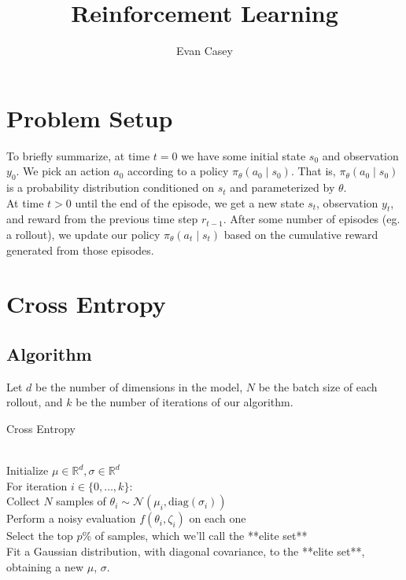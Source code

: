\documentclass[11pt]{article}
\theoremstyle{plain}
\theoremstyle{definition}
\begin{document}
\title{Reinforcement Learning}
\author{Evan Casey}
\maketitle
\setlength\parindent{0pt}

\section{Problem Setup}

To briefly summarize, at time $t = 0$ we have some initial state $s_0$ and observation $y_0$. We pick an action $a_0$ according to a policy $\pi_\theta(a_0 \mid s_0)$. That is, $\pi_\theta(a_0 \mid s_0)$ is a probability distribution conditioned on $s_t$ and parameterized by $\theta$.
\\

At time $t>0$ until the end of the episode, we get a new state $s_t$, observation $y_t$, and reward from the previous time step $r_{t-1}$. After some number of episodes (eg. a rollout), we update our policy $\pi_\theta(a_t \mid s_t)$ based on the cumulative reward generated from those episodes.

\section{Cross Entropy}

\subsection{Algorithm}
Let $d$ be the number of dimensions in the model, $N$ be the batch size of each rollout, and $k$ be the number of iterations of our algorithm.

\begin{algorithm}
\caption{Cross Entropy}
\begin{algorithmic}
\\Initialize $\mu \in \mathbb{R}^d, \sigma \in \mathbb{R}^d$
\\For iteration $i \in \{0,\ldots,k\}$:
\\  \hspace*{4} Collect $N$ samples of $\theta_i \sim \mathcal{N}(\mu_i, \text{diag}(\sigma_i))$
\\ \hspace*{4} Perform a noisy evaluation $f(\theta_i, \zeta_i)$ on each one
\\ \hspace*{4} Select the top $p\%$ of samples, which we'll call the **elite set**
\\ \hspace*{4} Fit a Gaussian distribution, with diagonal covariance, to the **elite set**, obtaining a new $\mu$, $\sigma$.
\end{algorithmic}
\end{algorithm}
\end{document}
